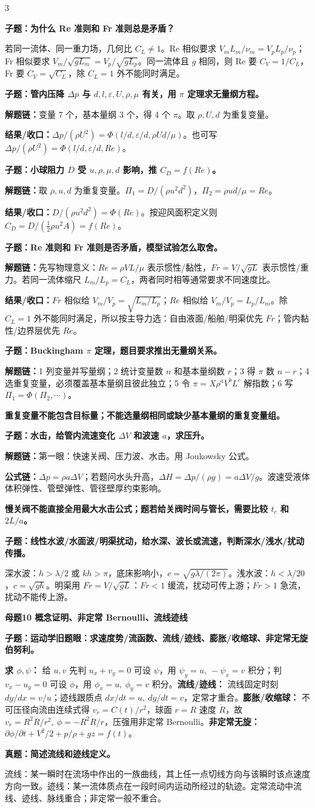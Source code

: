 \documentclass[a4paper]{article}
\newcommand{\mt}[1]{\vspace{0.45pt}\colorbox{M}{\parbox{\dimexpr\linewidth-2\fboxsep}{\color{white}\bfseries #1}}\par}
\newcommand{\qt}[1]{\vspace{0.25pt}\colorbox{Q}{\parbox{\dimexpr\linewidth-2\fboxsep}{\color{white}\bfseries #1}}\par}
\newcommand{\ans}[1]{\colorbox{G}{\parbox{\dimexpr\linewidth-2\fboxsep}{#1}}\par}
\newcommand{\warn}[1]{\colorbox{Y}{\parbox{\dimexpr\linewidth-2\fboxsep}{\color{E}\bfseries #1}}\par}
\newcommand{\chain}[1]{{\color{A}\bfseries 解题链：}#1\par}
\newcommand{\res}[1]{{\color{E}\bfseries 结果/收口：}#1\par}
\newcommand{\form}[1]{{\color{M}\bfseries 公式链：}#1\par}
\begin{document}
\begin{multicols}{3}
\qt{子题：为什么 Re 准则和 Fr 准则总是矛盾？}
\ans{若同一流体、同一重力场，几何比 $C_L\ne1$。Re 相似要求 $V_mL_m/\nu_m=V_pL_p/\nu_p$；Fr 相似要求 $V_m/\sqrt{gL_m}=V_p/\sqrt{gL_p}$。同一流体且 $g$ 相同，则 Re 要 $C_V=1/C_L$，Fr 要 $C_V=\sqrt{C_L}$，除 $C_L=1$ 外不能同时满足。}

\qt{子题：管内压降 $\Delta p$ 与 $d,l,\varepsilon,U,\rho,\mu$ 有关，用 $\pi$ 定理求无量纲方程。}
\chain{变量 7 个，基本量纲 3 个，得 4 个 $\pi$。取 $\rho,U,d$ 为重复变量。}
\res{$\Delta p/(\rho U^2)=\Phi(l/d,\varepsilon/d,\rho Ud/\mu)$。也可写 $\Delta p/(\rho U^2)=\Phi(l/d,\varepsilon/d,Re)$。}

\qt{子题：小球阻力 $D$ 受 $u,\rho,\mu,d$ 影响，推 $C_D=f(Re)$。}
\chain{取 $\rho,u,d$ 为重复变量。$\Pi_1=D/(\rho u^2d^2)$，$\Pi_2=\rho ud/\mu=Re$。}
\res{$D/(\rho u^2d^2)=\Phi(Re)$。按迎风面积定义则 $C_D=D/(\frac12\rho u^2A)=f(Re)$。}

\qt{子题：Re 准则和 Fr 准则是否矛盾，模型试验怎么取舍。}
\chain{先写物理意义：$Re=\rho VL/\mu$ 表示惯性/黏性，$Fr=V/\sqrt{gL}$ 表示惯性/重力。若同一流体缩尺 $L_m/L_p=C_L$，两者同时相等通常要求不同速度比。}
\res{$Fr$ 相似给 $V_m/V_p=\sqrt{L_m/L_p}$；$Re$ 相似给 $V_m/V_p=L_p/L_m$。除 $C_L=1$ 外不能同时满足，所以按主导力选：自由液面/船舶/明渠优先 $Fr$；管内黏性/边界层优先 $Re$。}

\qt{子题：Buckingham $\pi$ 定理，题目要求推出无量纲关系。}
\chain{1 列变量并写量纲；2 统计变量数 $n$ 和基本量纲数 $r$；3 得 $\pi$ 数 $n-r$；4 选重复变量，必须覆盖基本量纲且彼此独立；5 令 $\pi=X\rho^aV^bL^c$ 解指数；6 写 $\Pi_1=\Phi(\Pi_2,\cdots)$。}
\warn{重复变量不能包含目标量；不能选量纲相同或缺少基本量纲的重复变量组。}

\qt{子题：水击，给管内流速变化 $\Delta V$ 和波速 $a$，求压升。}
\chain{第一眼：快速关阀、压力波、水击。用 Joukowsky 公式。}
\form{$\Delta p=\rho a\Delta V$；若题问水头升高，$\Delta H=\Delta p/(\rho g)=a\Delta V/g$。波速受液体体积弹性、管壁弹性、管径壁厚约束影响。}
\warn{慢关阀不能直接全用最大水击公式；题若给关阀时间与管长，需要比较 $t_c$ 和 $2L/a$。}

\qt{子题：线性水波/水面波/明渠扰动，给水深、波长或流速，判断深水/浅水/扰动传播。}
\ans{深水波：$h>\lambda/2$ 或 $kh>\pi$，底床影响小，$c=\sqrt{g\lambda/(2\pi)}$。浅水波：$h<\lambda/20$，$c=\sqrt{gh}$。明渠用 $Fr=V/\sqrt{gL}$：$Fr<1$ 缓流，扰动可传上游；$Fr>1$ 急流，扰动不能传上游。}


\mt{母题10 概念证明、非定常 Bernoulli、流线迹线}
\qt{子题：运动学旧题眼：求速度势/流函数、流线/迹线、膨胀/收缩球、非定常无旋伯努利。}
\ans{\textbf{求 $\phi,\psi$：} 给 $u,v$ 先判 $u_x+v_y=0$ 可设 $\psi$，用 $\psi_y=u,\ -\psi_x=v$ 积分；判 $v_x-u_y=0$ 可设 $\phi$，用 $\phi_x=u,\ \phi_y=v$ 积分。\textbf{流线/迹线：} 流线固定时刻 $dy/dx=v/u$；迹线跟质点 $dx/dt=u,\ dy/dt=v$，定常才重合。\textbf{膨胀/收缩球：} 不可压径向流由连续式得 $v_r=C(t)/r^2$，球面 $r=R$ 速度 $\dot R$，故 $v_r=R^2\dot R/r^2,\ \phi=-R^2\dot R/r$，压强用非定常 Bernoulli。\textbf{非定常无旋：} $\partial\phi/\partial t+V^2/2+p/\rho+gz=f(t)$。}
\qt{真题：简述流线和迹线定义。}
\ans{流线：某一瞬时在流场中作出的一族曲线，其上任一点切线方向与该瞬时该点速度方向一致。迹线：某一流体质点在一段时间内运动所经过的轨迹。定常流动中流线、迹线、脉线重合；非定常一般不重合。}


\end{multicols}
\end{document}
